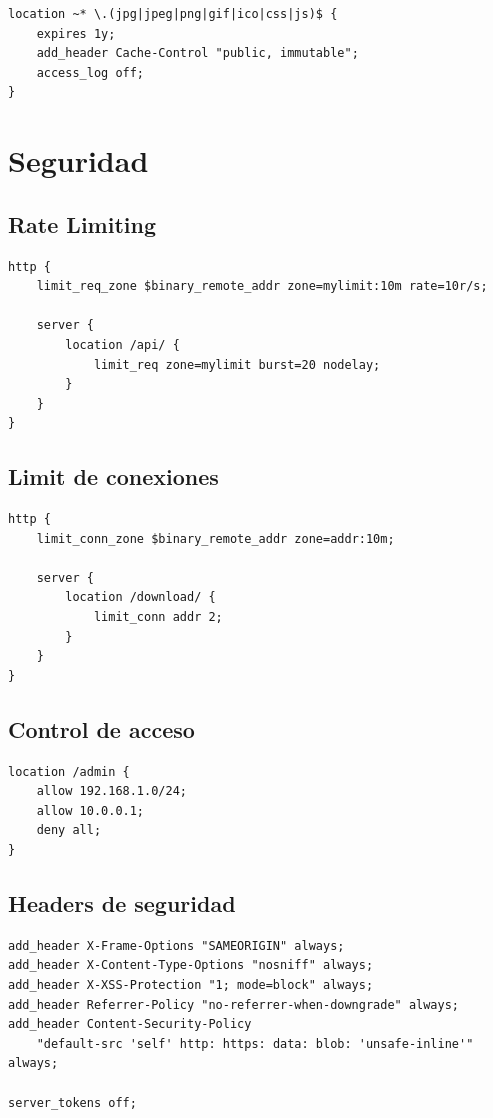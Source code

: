 \documentclass[11pt,a4paper]{article}
\begin{document}
\begin{lstlisting}
location ~* \.(jpg|jpeg|png|gif|ico|css|js)$ {
    expires 1y;
    add_header Cache-Control "public, immutable";
    access_log off;
}
\end{lstlisting}

\section{Seguridad}

\subsection{Rate Limiting}

\begin{lstlisting}[caption=Protección contra DDoS]
http {
    limit_req_zone $binary_remote_addr zone=mylimit:10m rate=10r/s;
    
    server {
        location /api/ {
            limit_req zone=mylimit burst=20 nodelay;
        }
    }
}
\end{lstlisting}

\subsection{Limit de conexiones}

\begin{lstlisting}
http {
    limit_conn_zone $binary_remote_addr zone=addr:10m;
    
    server {
        location /download/ {
            limit_conn addr 2;
        }
    }
}
\end{lstlisting}

\subsection{Control de acceso}

\begin{lstlisting}
location /admin {
    allow 192.168.1.0/24;
    allow 10.0.0.1;
    deny all;
}
\end{lstlisting}

\subsection{Headers de seguridad}

\begin{lstlisting}
add_header X-Frame-Options "SAMEORIGIN" always;
add_header X-Content-Type-Options "nosniff" always;
add_header X-XSS-Protection "1; mode=block" always;
add_header Referrer-Policy "no-referrer-when-downgrade" always;
add_header Content-Security-Policy 
    "default-src 'self' http: https: data: blob: 'unsafe-inline'" always;

server_tokens off;
\end{lstlisting}
\end{document}
